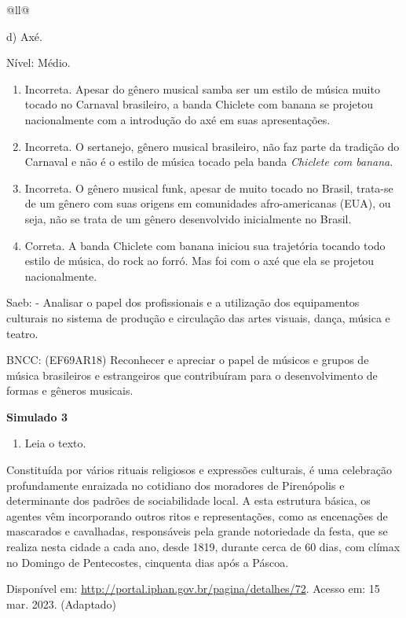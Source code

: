 \begin{itemize}
\begin{itemize}
\begin{escolha}[]{@{}ll@{}}
{{{{{{{{d) Axé.

Nível: Médio.

\begin{enumerate}
\def\labelenumi{\alph{enumi})}
\item
  Incorreta. Apesar do gênero musical samba ser um estilo de música
  muito tocado no Carnaval brasileiro, a banda Chiclete com banana se
  projetou nacionalmente com a introdução do axé em suas apresentações.
\item
  Incorreta. O sertanejo, gênero musical brasileiro, não faz parte da
  tradição do Carnaval e não é o estilo de música tocado pela banda
  \emph{Chiclete com banana}.
\item
  Incorreta. O gênero musical funk, apesar de muito tocado no Brasil,
  trata-se de um gênero com suas origens em comunidades afro-americanas
  (EUA), ou seja, não se trata de um gênero desenvolvido inicialmente no
  Brasil.
\item
  Correta. A banda Chiclete com banana iniciou sua trajetória tocando
  todo estilo de música, do rock ao forró. Mas foi com o axé que ela se
  projetou nacionalmente.
\end{enumerate}

Saeb: - Analisar o papel dos profissionais e a utilização dos
equipamentos culturais no sistema de produção e circulação das artes
visuais, dança, música e teatro.

BNCC: (EF69AR18) Reconhecer e apreciar o papel de músicos e grupos de
música brasileiros e estrangeiros que contribuíram para o
desenvolvimento de formas e gêneros musicais.

\textbf{Simulado 3}

\begin{enumerate}
\def\labelenumi{\arabic{enumi}.}
\item
  Leia o texto.
\end{enumerate}

Constituída por vários rituais religiosos e expressões culturais, é uma
celebração profundamente enraizada no cotidiano dos moradores de
Pirenópolis e determinante dos padrões de sociabilidade local. A esta
estrutura básica, os agentes vêm incorporando outros ritos e
representações, como as encenações de mascarados e cavalhadas,
responsáveis pela grande notoriedade da festa, que se realiza nesta
cidade a cada ano, desde 1819, durante cerca de 60 dias, com clímax no
Domingo de Pentecostes, cinquenta dias após a Páscoa.

Disponível em: \url{http://portal.iphan.gov.br/pagina/detalhes/72}.
Acesso em: 15 mar. 2023. (Adaptado)

}}}}}}}}
\end{escolha}
\end{itemize}
\end{itemize}
